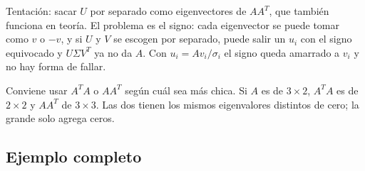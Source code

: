 \documentclass[11pt,letterpaper]{article}
\begin{document}
\begin{ojo}
    Tentación: sacar $U$ por separado como eigenvectores de $AA^{T}$,
    que también funciona en teoría. El problema es el signo: cada
    eigenvector se puede tomar como $v$ o $-v$, y si $U$ y $V$ se
    escogen por separado, puede salir un $u_i$ con el signo
    equivocado y $U\Sigma V^{T}$ ya no da $A$. Con $u_i = Av_i/\sigma_i$
    el signo queda amarrado a $v_i$ y no hay forma de fallar.
\end{ojo}

\begin{idea}
    Conviene usar $A^{T}A$ o $AA^{T}$ según cuál sea más chica. Si
    $A$ es de $3 \times 2$, $A^{T}A$ es de $2 \times 2$ y $AA^{T}$ de
    $3 \times 3$. Las dos tienen los mismos eigenvalores distintos de
    cero; la grande solo agrega ceros.
\end{idea}


\subsection*{Ejemplo completo}
\end{document}
